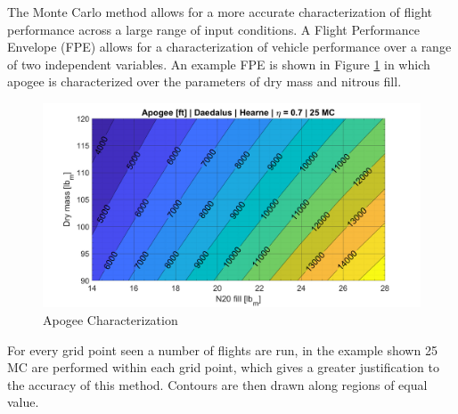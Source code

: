 \documentclass[10pt,a4paper]{article}
\begin{document}
The Monte Carlo method allows for a more accurate characterization of flight performance across a large range of input conditions. A Flight Performance Envelope (FPE) allows for a characterization of vehicle performance over a range of two independent variables. An example FPE is shown in Figure \ref{fig:apogee_eta70} in which apogee is characterized over the parameters of dry mass and nitrous fill. 
\begin{figure}[h!]
	\centering
	\includegraphics[width=1\textwidth]{./figs/apogee_eta70.png}
	\caption{Apogee Characterization}
	\label{fig:apogee_eta70}
\end{figure}
For every grid point seen a number of flights are run, in the example shown 25 MC are performed within each grid point, which gives a greater justification to the accuracy of this method. Contours are then drawn along regions of equal value. 
\end{document}
